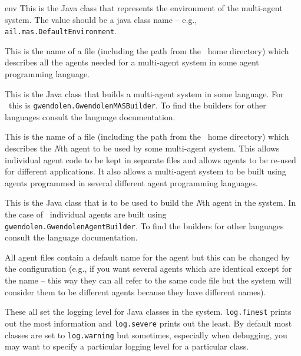 \begin{description}
\begin{sloppypar}
\item[env] This is the Java class that represents the environment of the multi-agent system.  The value should be a java class name -- e.g., \texttt{ail.mas.DefaultEnvironment}.
\end{sloppypar}
\item[mas.file] This is the name of a file (including the path from the \mcapl\ home directory) which describes all the agents needed for a multi-agent system in some agent programming language.
\item[mas.builder] This is the Java class that builds a multi-agent system in some language.  For \gwendolen\ this is \texttt{gwendolen.GwendolenMASBuilder}.  To find the builders for other languages consult the language documentation.
\item[mas.agent.\emph{N}.file] This is the name of a file (including the path from the \mcapl\ home directory) which describes the \emph{N}th agent to be used by some multi-agent system.  This allows individual agent code to be kept in separate files and allows agents to be re-used for different applications.  It also allows a multi-agent system to be built using agents programmed in several different agent programming languages.
\item[mas.agent.\emph{N}.builder] This is the Java class that is to be used to build the \emph{N}th agent in the system.  In the case of \gwendolen\ individual agents are built using \texttt{gwendolen.GwendolenAgentBuilder}.  To find the builders for other languages consult the language documentation.
\item[mas.agent.\emph{N}.name] All agent files contain a default name for the agent but this can be changed by the configuration (e.g., if you want several agents which are identical except for the name -- this way they can all refer to the same code file but the system will consider them to be different agents because they have different names).
\item[log.severe, log.warning, log.info, log.fine, log.finer, log.finest] These all set the logging level for Java classes in the system.  \texttt{log.finest} prints out the most information and \texttt{log.severe} prints out the least.  By default most classes are set to \texttt{log.warning} but sometimes, especially when debugging, you may want to specify a particular logging level for a particular class. 

\end{description}
